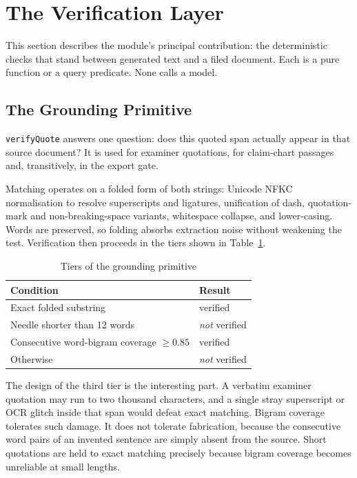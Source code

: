 \documentclass[conference]{IEEEtran}
\newcommand{\code}[1]{\texttt{\small #1}}
\begin{document}
\section{The Verification Layer}
\label{sec:verification}

This section describes the module's principal contribution: the deterministic checks that stand between generated text and a filed document. Each is a pure function or a query predicate. None calls a model.

\subsection{The Grounding Primitive}

\code{verifyQuote} answers one question: does this quoted span actually appear in that source document? It is used for examiner quotations, for claim-chart passages and, transitively, in the export gate.

Matching operates on a folded form of both strings: Unicode NFKC normalisation to resolve superscripts and ligatures, unification of dash, quotation-mark and non-breaking-space variants, whitespace collapse, and lower-casing. Words are preserved, so folding absorbs extraction noise without weakening the test. Verification then proceeds in the tiers shown in Table~\ref{tab:verify}.

\begin{table}[h]
\caption{Tiers of the grounding primitive}
\label{tab:verify}
\centering
\footnotesize
\renewcommand{\arraystretch}{1.2}
\begin{tabular}{@{}ll@{}}
\toprule
\textbf{Condition} & \textbf{Result} \\
\midrule
Exact folded substring & verified \\
Needle shorter than 12 words & \emph{not} verified \\
Consecutive word-bigram coverage $\geq 0.85$ & verified \\
Otherwise & \emph{not} verified \\
\bottomrule
\end{tabular}
\end{table}

The design of the third tier is the interesting part. A verbatim examiner quotation may run to two thousand characters, and a single stray superscript or OCR glitch inside that span would defeat exact matching. Bigram coverage tolerates such damage. It does not tolerate fabrication, because the consecutive word pairs of an invented sentence are simply absent from the source. Short quotations are held to exact matching precisely because bigram coverage becomes unreliable at small lengths.
\end{document}
